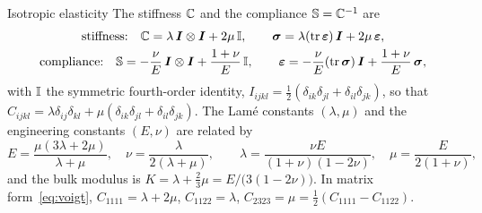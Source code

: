 \begin{gbox}{Isotropic elasticity}
%
The stiffness $\mathbb{C}$ and the compliance $\mathbb{S}=\mathbb{C}^{-1}$ are
\begin{gather}
  \text{stiffness:}\quad \mathbb{C}=\lambda\,\bm{I}\otimes\bm{I}+2\mu\,\mathbb{I},\qquad
  \bm{\sigma}=\lambda(\operatorname{tr}\bm{\varepsilon})\,\bm{I}+2\mu\,\bm{\varepsilon},\\
  \text{compliance:}\quad \mathbb{S}=-\frac{\nu}{E}\,\bm{I}\otimes\bm{I}+\frac{1+\nu}{E}\,\mathbb{I},\qquad
  \bm{\varepsilon}=-\frac{\nu}{E}(\operatorname{tr}\bm{\sigma})\,\bm{I}+\frac{1+\nu}{E}\,\bm{\sigma},
\end{gather}
with $\mathbb{I}$ the symmetric fourth-order identity,
$I_{ijkl}=\tfrac12(\delta_{ik}\delta_{jl}+\delta_{il}\delta_{jk})$, so that
$C_{ijkl}=\lambda\delta_{ij}\delta_{kl}+\mu(\delta_{ik}\delta_{jl}+\delta_{il}\delta_{jk})$.
The Lam\'e constants $(\lambda,\mu)$ and the engineering constants
$(E,\nu)$ are related by
\begin{equation}\label{eq:lame}
  E=\frac{\mu(3\lambda+2\mu)}{\lambda+\mu},\quad
  \nu=\frac{\lambda}{2(\lambda+\mu)},\qquad
  \lambda=\frac{\nu E}{(1+\nu)(1-2\nu)},\quad
  \mu=\frac{E}{2(1+\nu)} ,
\end{equation}
and the bulk modulus is $K=\lambda+\tfrac23\mu=E/\bigl(3(1-2\nu)\bigr)$.
In matrix form~\eqref{eq:voigt}, $C_{1111}=\lambda+2\mu$, $C_{1122}=\lambda$,
$C_{2323}=\mu=\tfrac12(C_{1111}-C_{1122})$.
\end{gbox}

